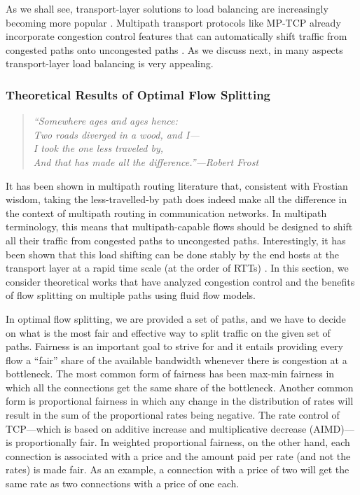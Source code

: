 \documentclass[10pt]{IEEEtran}
\begin{document}
As we shall see, transport-layer solutions to load balancing are increasingly becoming more popular \cite{key2007path,honda2009multipath,wischik2010balancing,peng2015multipath}. Multipath transport protocols like MP-TCP already incorporate congestion control features that can automatically shift traffic from congested paths onto uncongested paths \cite{raiciu2011coupled}. As we discuss next, in many aspects transport-layer load balancing is very appealing. 

\subsubsection{Theoretical Results of Optimal Flow Splitting}
\label{subsubsec: theor}

\vspace{4mm}
\begin{quotation}
\textit{``Somewhere ages and ages hence:\\
Two roads diverged in a wood, and I---\\
I took the one less traveled by,\\
And that has made all the difference.''---Robert Frost}
\end{quotation}

\vspace{2mm}

It has been shown in multipath routing literature \cite{kelly2005stability} that, consistent with Frostian wisdom, taking the less-travelled-by path does indeed make all the difference in the context of multipath routing in communication networks. In multipath terminology, this means that multipath-capable flows should be designed to shift all their traffic from congested paths to uncongested paths. Interestingly, it has been shown that this load shifting can be done stably by the end hosts at the transport layer at a rapid time scale (at the order of RTTs) \cite{kelly2005stability}. In this section, we consider theoretical works that have analyzed congestion control and the benefits of flow splitting on multiple paths using fluid flow models. 

In optimal flow splitting, we are provided a set of paths, and we have to decide on what is the most fair and effective way to split traffic on the given set of paths. Fairness is an important goal to strive for and it entails providing every flow a ``fair'' share of the available bandwidth whenever there is congestion at a bottleneck. The most common form of fairness has been max-min fairness in which all the connections get the same share of the bottleneck. Another common form is proportional fairness in which any change in the distribution of rates will result in the sum of the proportional rates being negative. The rate control of TCP---which is based on additive increase and multiplicative decrease (AIMD)---is proportionally fair. In weighted proportional fairness, on the other hand, each connection is associated with a price and the amount paid per rate (and not the rates) is made fair. As an example, a connection with a price of two will get the same rate as two connections with a price of one each. 
\end{document}
